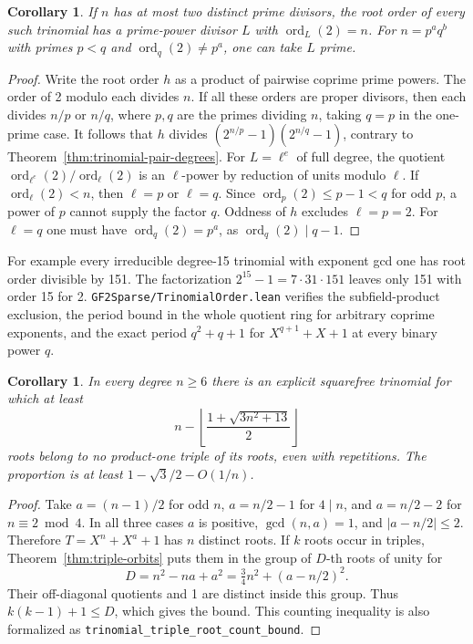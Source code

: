 \documentclass[11pt]{article}
\newtheorem{corollary}[theorem]{Corollary}
\newcommand{\ord}{\operatorname{ord}}
\begin{document}
\begin{corollary}\label{cor:trinomial-full-order-component}
If \(n\) has at most two distinct prime divisors, the root order of
every such trinomial has a prime-power divisor \(L\) with
\(\ord_L(2)=n\). For \(n=p^a q^b\) with primes \(p<q\) and
\(\ord_q(2)\ne p^a\), one can take \(L\) prime.
\end{corollary}
\begin{proof}
Write the root order \(h\) as a product of pairwise coprime prime powers.
The order of 2 modulo each divides \(n\). If all these orders are
proper divisors, then each divides \(n/p\) or \(n/q\), where \(p,q\)
are the primes dividing \(n\), taking \(q=p\) in the one-prime case.
It follows that \(h\) divides \((2^{n/p}-1)(2^{n/q}-1)\), contrary
to Theorem~\ref{thm:trinomial-pair-degrees}.
For \(L=\ell^e\) of full degree, the quotient
\(\ord_{\ell^e}(2)/\ord_\ell(2)\) is an \(\ell\)-power by reduction
of units modulo \(\ell\). If \(\ord_\ell(2)<n\), then \(\ell=p\)
or \(\ell=q\). Since \(\ord_p(2)\le p-1<q\) for odd \(p\), a power
of \(p\) cannot supply the factor \(q\). Oddness of \(h\) excludes
\(\ell=p=2\). For \(\ell=q\) one must have
\(\ord_q(2)=p^a\), as \(\ord_q(2)\mid q-1\).
\end{proof}

For example every irreducible degree-15 trinomial with exponent gcd
one has root order divisible by 151. The factorization
\(2^{15}-1=7\cdot31\cdot151\) leaves only 151 with order 15 for 2.
\nolinkurl{GF2Sparse/TrinomialOrder.lean} verifies the subfield-product
exclusion, the period bound in the whole quotient ring for arbitrary
coprime exponents, and the exact period \(q^2+q+1\) for \(X^{q+1}+X+1\)
at every binary power \(q\).

\begin{corollary}\label{cor:trinomial-good-roots}
In every degree \(n\ge6\) there is an explicit squarefree trinomial
for which at least
\[
       n-\left\lfloor\frac{1+\sqrt{3n^2+13}}{2}\right\rfloor
\]
roots belong to no product-one triple of its roots, even with repetitions.
The proportion is at least \(1-\sqrt{3}/2-O(1/n)\).
\end{corollary}
\begin{proof}
Take \(a=(n-1)/2\) for odd \(n\), \(a=n/2-1\) for \(4\mid n\),
and \(a=n/2-2\) for \(n\equiv2\bmod4\).
In all three cases \(a\) is positive, \(\gcd(n,a)=1\), and
\(|a-n/2|\le2\). Therefore \(T=X^n+X^a+1\) has \(n\) distinct roots.
If \(k\) roots occur in triples, Theorem~\ref{thm:triple-orbits} puts
them in the group of \(D\)-th roots of unity for
\[
        D=n^2-na+a^2=\tfrac34n^2+(a-n/2)^2.
\]
Their off-diagonal quotients and 1 are distinct inside this group.
Thus \(k(k-1)+1\le D\), which gives the bound. This counting inequality
is also formalized as \texttt{trinomial\_triple\_root\_count\_bound}.
\end{proof}
\end{document}

